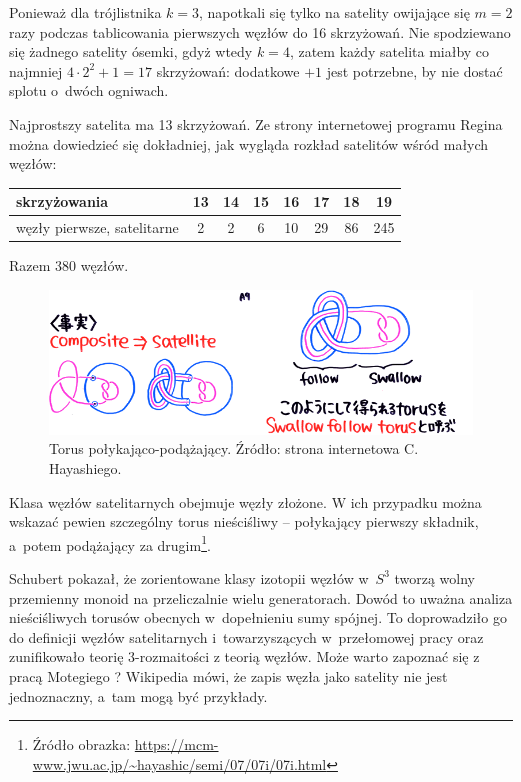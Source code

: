 Ponieważ dla trójlistnika $k = 3$, napotkali się tylko na satelity owijające się $m = 2$ razy podczas tablicowania pierwszych węzłów do 16 skrzyżowań.
Nie spodziewano się żadnego satelity ósemki, gdyż wtedy $k = 4$, zatem każdy satelita miałby co najmniej $4 \cdot 2^2 + 1 = 17$ skrzyżowań: dodatkowe $+1$ jest potrzebne, by nie dostać splotu o~dwóch ogniwach.

Najprostszy satelita ma 13 skrzyżowań.
Ze strony internetowej programu Regina można dowiedzieć się dokładniej, jak wygląda rozkład satelitów wśród małych węzłów:

\renewcommand*{\arraystretch}{1.4}
\footnotesize
\begin{longtable}{lccccccc}
    \hline
    \textbf{skrzyżowania} & 13 & 14 & 15 & 16 & 17 & 18 & 19 \\ \hline \endhead
    węzły pierwsze, satelitarne & 2 & 2 & 6 & 10 & 29 & 86 & 245 \\
    \hline
\end{longtable}
\normalsize

Razem 380 węzłów.

\begin{example}
\label{swallow_follow_torus}
%
    \begin{figure}[H]
        \centering
        \includegraphics[width=0.75\linewidth]{../data/mixed/follow-swallow.png}
        \caption[something]{Torus połykająco-podążający. Źródło: strona internetowa  C. Hayashiego.}
    \end{figure}
    Klasa węzłów satelitarnych obejmuje węzły złożone.
    W ich przypadku można wskazać pewien szczególny torus nieściśliwy -- połykający pierwszy składnik, a~potem podążający za drugim\footnote{Źródło obrazka: \url{https://mcm-www.jwu.ac.jp/~hayashic/semi/07/07i/07i.html}}.
\end{example}

Schubert pokazał, że zorientowane klasy izotopii węzłów w~$S^3$ tworzą wolny przemienny monoid na przeliczalnie wielu generatorach.
%
Dowód to uważna analiza nieściśliwych torusów obecnych w~dopełnieniu sumy spójnej.
To doprowadziło go do definicji węzłów satelitarnych i~towarzyszących w~przełomowej pracy \cite{schubert1953} oraz zunifikowało teorię 3-rozmaitości z teorią węzłów.
Może warto zapoznać się z pracą Motegiego \cite{motegi1997}?
Wikipedia mówi, że zapis węzła jako satelity nie jest jednoznaczny, a~tam mogą być przykłady.

